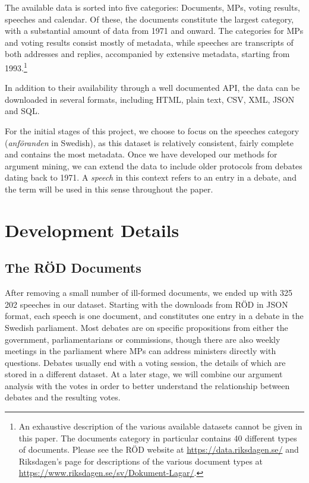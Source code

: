 The available data is sorted into five categories: Documents, MPs, voting results, speeches and calendar. Of these, the documents constitute the largest category, with a substantial amount of data from 1971 and onward. The categories for MPs and voting results consist mostly of metadata, while speeches are transcripts of both addresses and replies, accompanied by extensive metadata, starting from 1993.\footnote{An exhaustive description of the various available datasets cannot be given in this paper. The documents category in particular contains 40 different types of documents. Please see the RÖD website at \url{https://data.riksdagen.se/} and Riksdagen's page for descriptions of the various document types at \url{https://www.riksdagen.se/sv/Dokument-Lagar/}.}

In addition to their availability through a well documented API, the data can be downloaded in several formats, including HTML, plain text, CSV, XML, JSON and SQL.

For the initial stages of this project, we choose to focus on the speeches category (\emph{anföranden} in Swedish), as this dataset is relatively consistent, fairly complete and contains the most metadata. Once we have developed our methods for argument mining, we can extend the data to include older protocols from debates dating back to 1971. A \emph{speech} in this context refers to an entry in a debate, and the term will be used in this sense throughout the paper.

\section{Development Details}

\subsection{The RÖD Documents}

After removing a small number of ill-formed documents, we ended up with 325\,202 speeches in our dataset. Starting with the downloads from RÖD in JSON format, each speech is one document, and constitutes one entry in a debate in the Swedish parliament. Most debates are on specific propositions from either the government, parliamentarians or commissions, though there are also weekly meetings in the parliament where MPs can address ministers directly with questions. Debates usually end with a voting session, the details of which are stored in a different dataset. At a later stage, we will combine our argument analysis with the votes in order to better understand the relationship between debates and the resulting votes.

